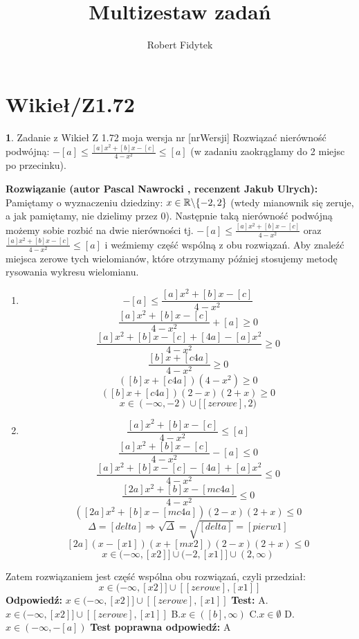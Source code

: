 \documentclass[12pt, a4paper]{article}
\title{Multizestaw zadań}
\author{Robert Fidytek}
\date{}
\theoremstyle{definition} %
\newtheorem{zad}{}
\newcommand{\kategoria}[1]{\section{#1}} %
\newcommand{\zadStart}[1]{\begin{zad}#1\newline} %
\newcommand{\zadStop}{\end{zad}}   %
\newcommand{\rozwStart}[2]{\noindent \textbf{Rozwiązanie (autor #1 , recenzent #2): }\newline} %
\newcommand{\rozwStop}{\newline}                                            %
\newcommand{\odpStart}{\noindent \textbf{Odpowiedź:}\newline}    %
\newcommand{\odpStop}{\newline}                                             %
\newcommand{\testStart}{\noindent \textbf{Test:}\newline} %
\newcommand{\testStop}{\newline} %
\newcommand{\kluczStart}{\noindent \textbf{Test poprawna odpowiedź:}\newline} %
\newcommand{\kluczStop}{\newline} %
\begin{document}
\maketitle


\kategoria{Wikieł/Z1.72}
\zadStart{Zadanie z Wikieł Z 1.72 moja wersja nr [nrWersji]}
Rozwiązać nierówność podwójną: $-[a]\leq\frac{[a]x^2+[b]x-[c]}{4-x^2}\leq [a]$ (w zadaniu zaokrąglamy do 2 miejsc po przecinku).
\zadStop
\rozwStart{Pascal Nawrocki}{Jakub Ulrych}
Pamiętamy o wyznaczeniu dziedziny:  $x\in\mathbb{R}\symbol{92}\{-2,2\}$ (wtedy mianownik się zeruje, a jak pamiętamy, nie dzielimy przez 0).
Następnie taką nierówność podwójną możemy sobie rozbić na dwie nierówności tj. $-[a]\leq\frac{[a]x^2+[b]x-[c]}{4-x^2}$ oraz $\frac{[a]x^2+[b]x-[c]}{4-x^2}\leq [a]$ i weźmiemy część wspólną z obu rozwiązań. Aby znaleźć miejsca zerowe tych wielomianów, które otrzymamy później stosujemy metodę rysowania wykresu wielomianu.
\begin{enumerate}
\item
$$-[a]\leq\frac{[a]x^2+[b]x-[c]}{4-x^2}$$
$$\frac{[a]x^2+[b]x-[c]}{4-x^2}+[a]\geq0$$
$$\frac{[a]x^2+[b]x-[c]+[4a]-[a]x^2}{4-x^2}\geq0$$
$$\frac{[b]x+[c4a]}{4-x^2}\geq0$$
$$([b]x+[c4a])(4-x^2)\geq0$$
$$([b]x+[c4a])(2-x)(2+x)\geq0$$
$$x\in(-\infty,-2)\cup[[zerowe],2)$$
\item
$$\frac{[a]x^2+[b]x-[c]}{4-x^2}\leq [a]$$
$$\frac{[a]x^2+[b]x-[c]}{4-x^2}-[a]\leq0$$
$$\frac{[a]x^2+[b]x-[c]-[4a]+[a]x^2}{4-x^2}\leq0$$
$$\frac{[2a]x^2+[b]x-[mc4a]}{4-x^2}\leq0$$
$$([2a]x^2+[b]x-[mc4a])(2-x)(2+x)\leq0$$
$$\Delta=[delta]\Rightarrow \sqrt{\Delta}=\sqrt{[delta]}=[pierw1]$$
$$[2a](x-[x1])(x+[mx2])(2-x)(2+x)\leq0$$
$$x\in(-\infty,[x2]]\cup(-2,[x1]]\cup(2,\infty)$$
\end{enumerate}
Zatem rozwiązaniem jest część wspólna obu rozwiązań, czyli przedział: $$x\in(-\infty,[x2]]\cup[[zerowe],[x1]]$$
\rozwStop
\odpStart
$x\in(-\infty,[x2]]\cup[[zerowe],[x1]]$
\odpStop
\testStart
A. $x\in(-\infty,[x2]]\cup[[zerowe],[x1]]$
B.$x\in([b],\infty)$
C.$x\in\emptyset$
D.$x\in(-\infty,-[a])$
\testStop
\kluczStart
A
\kluczStop
\end{document}
